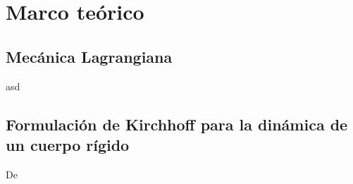 \section{Marco teórico}

\subsection{Mecánica Lagrangiana}

asd

\subsection{Formulación de Kirchhoff para la dinámica de un cuerpo rígido}

De

